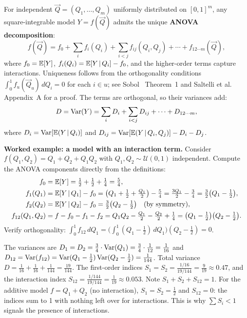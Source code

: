 For independent \POIs $\vec{Q} = (Q_1,\ldots,Q_m)$ uniformly
distributed on $[0,1]^m$, any square-integrable model $Y = f(\vec{Q})$
admits the unique \textbf{ANOVA decomposition}:
\begin{equation}
  f(\vec{Q}) = f_0 + \sum_i f_i(Q_i)
             + \sum_{i<j} f_{ij}(Q_i, Q_j) + \cdots + f_{12\cdots m}(\vec{Q}),
  \label{eq:ANOVA}
\end{equation}
where $f_0 = \mathbb{E}[Y]$, $f_i(Q_i) = \mathbb{E}[Y\,|\,Q_i] - f_0$, and the
higher-order terms capture interactions. Uniqueness follows from the
orthogonality conditions $\int_0^1 f_{u}(\vec{Q}_u)\,dQ_i = 0$
for each $i \in u$; see Sobol~\cite{sobol2001global} Theorem~1
and Saltelli et al.~\cite{saltelli2008global} Appendix~A for a proof.
The terms are orthogonal, so their variances add:
\begin{equation}
  D = \operatorname{Var}(Y) = \sum_i D_i + \sum_{i<j} D_{ij} + \cdots + D_{12\cdots m},
  \label{eq:variancedec}
\end{equation}
where $D_i = \operatorname{Var}[\mathbb{E}(Y\,|\,Q_i)]$ and $D_{ij} = \operatorname{Var}[\mathbb{E}(Y\,|\,Q_i,Q_j)] - D_i - D_j$.

\medskip\noindent
\textbf{Worked example: a model with an interaction term.}
Consider $f(Q_1, Q_2) = Q_1 + Q_2 + Q_1 Q_2$ with $Q_1, Q_2 \sim \mathcal{U}(0,1)$
independent. Compute the ANOVA components directly from the definitions:
\begin{align*}
  f_0 &= \mathbb{E}[Y] = \tfrac{1}{2} + \tfrac{1}{2} + \tfrac{1}{4} = \tfrac{5}{4},\\
  f_1(Q_1) &= \mathbb{E}[Y\,|\,Q_1] - f_0
    = \bigl(Q_1 + \tfrac{1}{2} + \tfrac{Q_1}{2}\bigr) - \tfrac{5}{4}
    = \tfrac{3Q_1}{2} - \tfrac{3}{4} = \tfrac{3}{2}\bigl(Q_1 - \tfrac{1}{2}\bigr),\\
  f_2(Q_2) &= \mathbb{E}[Y\,|\,Q_2] - f_0
    = \tfrac{3}{2}\bigl(Q_2 - \tfrac{1}{2}\bigr) \quad\text{(by symmetry)},\\
  f_{12}(Q_1,Q_2) &= f - f_0 - f_1 - f_2
    = Q_1 Q_2 - \tfrac{Q_1}{2} - \tfrac{Q_2}{2} + \tfrac{1}{4}
    = \bigl(Q_1 - \tfrac{1}{2}\bigr)\bigl(Q_2 - \tfrac{1}{2}\bigr).
\end{align*}
Verify orthogonality: $\int_0^1 f_{12}\,dQ_1 = \bigl(\int_0^1(Q_1-\tfrac{1}{2})\,dQ_1\bigr)(Q_2-\tfrac{1}{2}) = 0$. \checkmark

The variances are $D_1 = D_2 = \tfrac{3}{4} \cdot \operatorname{Var}(Q_1) = \tfrac{3}{4}\cdot\tfrac{1}{12} = \tfrac{1}{16}$
and $D_{12} = \operatorname{Var}(f_{12}) = \operatorname{Var}(Q_1-\tfrac{1}{2})\operatorname{Var}(Q_2-\tfrac{1}{2}) = \tfrac{1}{144}$.
Total variance $D = \tfrac{1}{16} + \tfrac{1}{16} + \tfrac{1}{144} = \tfrac{19}{144}$.
The first-order indices $S_1 = S_2 = \tfrac{1/16}{19/144} = \tfrac{9}{19} \approx 0.47$,
and the interaction index $S_{12} = \tfrac{1/144}{19/144} = \tfrac{1}{19} \approx 0.053$.
Note $S_1 + S_2 + S_{12} = 1$. For the additive model $f = Q_1 + Q_2$
(no interaction), $S_1 = S_2 = \tfrac{1}{2}$ and $S_{12} = 0$: the indices
sum to 1 with nothing left over for interactions.
This is why $\sum S_i < 1$ signals the presence of interactions.

